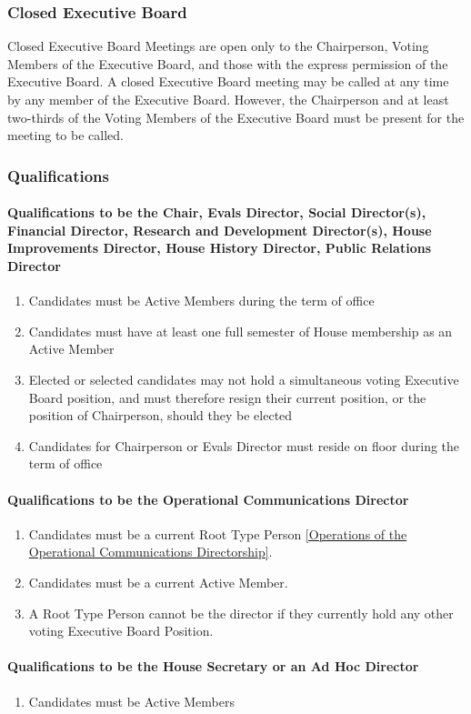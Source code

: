 \documentclass{article}
\newcommand{\asubsection}[1]{\subsubsection{#1} \label{#1}}
\newcommand{\asubsubsection}[1]{\paragraph{#1} \label{#1}}
\begin{document}
\asubsection{Closed Executive Board}
Closed Executive Board Meetings are open only to the Chairperson, Voting Members of the Executive Board, and those with the express permission of the Executive Board.
A closed Executive Board meeting may be called at any time by any member of the Executive Board.
However, the Chairperson and at least two-thirds of the Voting Members of the Executive Board must be present for the meeting to be called.

\asubsection{Qualifications}
\asubsubsection{Qualifications to be the Chair, Evals Director, Social Director(s), Financial Director, Research and Development Director(s), House Improvements Director, House History Director, Public Relations Director}
\begin{enumerate}
	\item Candidates must be Active Members during the term of office
	\item Candidates must have at least one full semester of House membership as an Active Member
	\item Elected or selected candidates may not hold a simultaneous voting Executive Board position, and must therefore resign their current position, or the position of Chairperson, should they be elected
  \item Candidates for Chairperson or Evals Director must reside on floor during the term of office
\end{enumerate}
\asubsubsection{Qualifications to be the Operational Communications Director}
\begin{enumerate}
	\item Candidates must be a current Root Type Person \ref{Operations of the Operational Communications Directorship}.
	\item Candidates must be a current Active Member.
	\item A Root Type Person cannot be the director if they currently hold any other voting Executive Board Position.
\end{enumerate}

\asubsubsection{Qualifications to be the House Secretary or an Ad Hoc Director}
\begin{enumerate}
\item Candidates must be Active Members
\end{enumerate}
\end{document}
